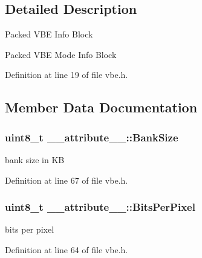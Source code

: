 \subsection{Detailed Description}
Packed V\+B\+E Info Block

Packed V\+B\+E Mode Info Block 

Definition at line 19 of file vbe.\+h.



\subsection{Member Data Documentation}
\hypertarget{struct____attribute_____aa1307567cbc12f9c5c724b7457be14ad}{}
\subsubsection[{Bank\+Size}]{\setlength{\rightskip}{0pt plus 5cm}uint8\+\_\+t \+\_\+\+\_\+attribute\+\_\+\+\_\+\+::\+Bank\+Size}\label{struct____attribute_____aa1307567cbc12f9c5c724b7457be14ad}


bank size in K\+B 



Definition at line 67 of file vbe.\+h.

\hypertarget{struct____attribute_____abd9c59af53589a54188bb57ada5c5f26}{}
\subsubsection[{Bits\+Per\+Pixel}]{\setlength{\rightskip}{0pt plus 5cm}uint8\+\_\+t \+\_\+\+\_\+attribute\+\_\+\+\_\+\+::\+Bits\+Per\+Pixel}\label{struct____attribute_____abd9c59af53589a54188bb57ada5c5f26}


bits per pixel 



Definition at line 64 of file vbe.\+h.

\hypertarget{struct____attribute_____ada852d5ed926757d24b5038a38e6292c}{}
